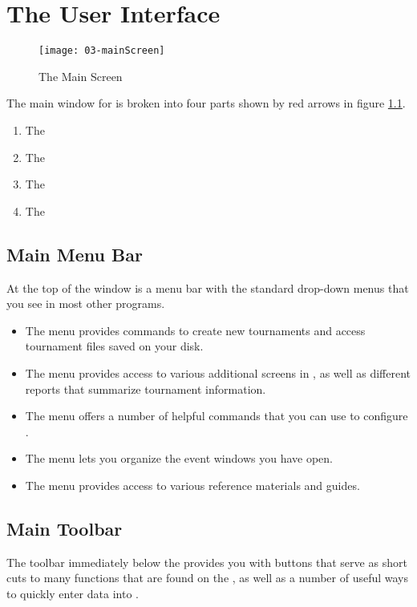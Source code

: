 \documentclass[a4paper,11pt]{memoir}
\begin{document}
\chapter{The User Interface}

\begin{figure}[!ht]
 \centering
 \texttt{[image: 03-mainScreen]}
 \caption{The Main Screen} \label{fig:03-mainScreen}
\end{figure}

The main window for \fencingtime{} is broken into four parts shown by red arrows in figure \ref{fig:03-mainScreen}.

\begin{enumerate}
 \item The 
 \item The 
 \item The 
 \item The 
\end{enumerate}

\section{Main Menu Bar}
At the top of the window is a menu bar with the standard drop-down menus that you see in most other programs. 

\begin{itemize}
 \item The  menu provides commands to create new tournaments and access \gls{tournament} files saved on your disk. 
 \item The  menu provides access to various additional screens in \fencingtime{}, as well as different reports that summarize tournament information. 
 \item The  menu offers a number of helpful commands that you can use to configure \fencingtime{}. 
 \item The  menu lets you organize the event windows you have open.
 \item The  menu provides access to various reference materials and guides.
\end{itemize}

\section{Main Toolbar}
The toolbar immediately below the  provides you with buttons that serve as short cuts to many functions that are found on the , as well as a number of useful ways to quickly enter data into \fencingtime{}.
\end{document}
